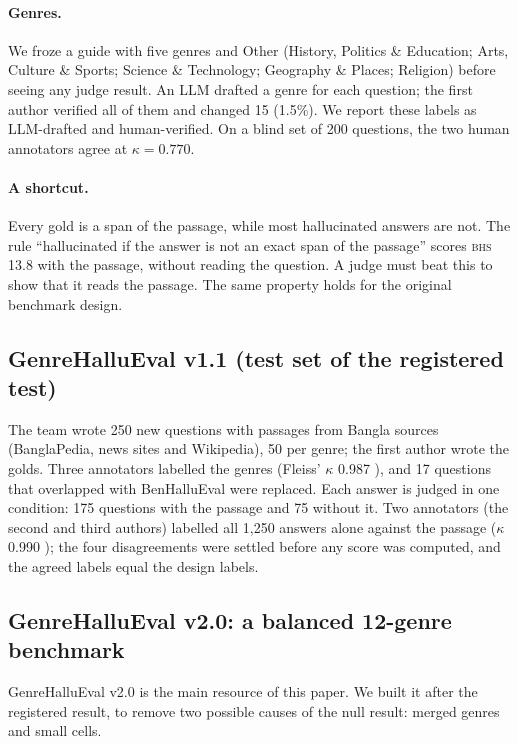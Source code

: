 \documentclass[pdflatex,sn-apa]{sn-jnl}
\newcommand{\BHS}{\textsc{bhs}}
\begin{document}
\paragraph{Genres.} We froze a guide with five genres and Other (History, Politics \& Education; Arts, Culture \&
Sports; Science \& Technology; Geography \& Places; Religion) before seeing any judge result. An LLM drafted a genre
for each question; the first author verified all of them and changed 15 (1.5\%). We report these labels as
LLM-drafted and human-verified. On a blind set of 200 questions, the two human annotators agree at $\kappa=0.770$.

\paragraph{A shortcut.} Every gold is a span of the passage, while most hallucinated answers are not. The rule
``hallucinated if the answer is not an exact span of the passage'' scores \BHS{} 13.8 with the passage, without
reading the question. A judge must beat this to show that it reads the passage. The same property holds for the
original benchmark design.

\subsection{GenreHalluEval v1.1 (test set of the registered test)}

The team wrote 250 new questions with passages from Bangla sources (BanglaPedia, news sites and Wikipedia), 50 per
genre; the first author wrote the golds. Three annotators labelled the genres (Fleiss' $\kappa$ 0.987 \citep{fleiss1971}),
and 17 questions that overlapped with BenHalluEval were replaced. Each answer is judged in one condition: 175 questions
with the passage and 75 without it. Two annotators (the second and third authors) labelled all 1,250 answers alone
against the passage ($\kappa$ 0.990 \citep{cohen1960}); the four disagreements were settled before any score was
computed, and the agreed labels equal the design labels.

\subsection{GenreHalluEval v2.0: a balanced 12-genre benchmark}\label{sec:v2}

GenreHalluEval v2.0 is the main resource of this paper. We built it after the registered result, to remove two
possible causes of the null result: merged genres and small cells.
\end{document}
